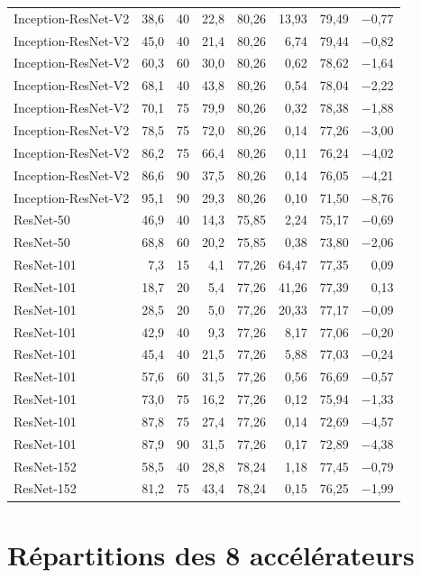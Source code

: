 {\begin{longtable}{@{}lrrrrrrr@{}}
Inception-ResNet-V2 & 38,6 & 40 & 22,8 & 80,26 & 13,93 & 79,49 & $-$0,77 \\
Inception-ResNet-V2 & 45,0 & 40 & 21,4 & 80,26 & 6,74 & 79,44 & $-$0,82 \\
Inception-ResNet-V2 & 60,3 & 60 & 30,0 & 80,26 & 0,62 & 78,62 & $-$1,64 \\
Inception-ResNet-V2 & 68,1 & 40 & 43,8 & 80,26 & 0,54 & 78,04 & $-$2,22 \\
Inception-ResNet-V2 & 70,1 & 75 & 79,9 & 80,26 & 0,32 & 78,38 & $-$1,88 \\
Inception-ResNet-V2 & 78,5 & 75 & 72,0 & 80,26 & 0,14 & 77,26 & $-$3,00 \\
Inception-ResNet-V2 & 86,2 & 75 & 66,4 & 80,26 & 0,11 & 76,24 & $-$4,02 \\
Inception-ResNet-V2 & 86,6 & 90 & 37,5 & 80,26 & 0,14 & 76,05 & $-$4,21 \\
Inception-ResNet-V2 & 95,1 & 90 & 29,3 & 80,26 & 0,10 & 71,50 & $-$8,76 \\
\addlinespace[2pt]
ResNet-50 & 46,9 & 40 & 14,3 & 75,85 & 2,24 & 75,17 & $-$0,69 \\
ResNet-50 & 68,8 & 60 & 20,2 & 75,85 & 0,38 & 73,80 & $-$2,06 \\
\addlinespace[2pt]
ResNet-101 & 7,3 & 15 & 4,1 & 77,26 & 64,47 & 77,35 & 0,09 \\
ResNet-101 & 18,7 & 20 & 5,4 & 77,26 & 41,26 & 77,39 & 0,13 \\
ResNet-101 & 28,5 & 20 & 5,0 & 77,26 & 20,33 & 77,17 & $-$0,09 \\
ResNet-101 & 42,9 & 40 & 9,3 & 77,26 & 8,17 & 77,06 & $-$0,20 \\
ResNet-101 & 45,4 & 40 & 21,5 & 77,26 & 5,88 & 77,03 & $-$0,24 \\
ResNet-101 & 57,6 & 60 & 31,5 & 77,26 & 0,56 & 76,69 & $-$0,57 \\
ResNet-101 & 73,0 & 75 & 16,2 & 77,26 & 0,12 & 75,94 & $-$1,33 \\
ResNet-101 & 87,8 & 75 & 27,4 & 77,26 & 0,14 & 72,69 & $-$4,57 \\
ResNet-101 & 87,9 & 90 & 31,5 & 77,26 & 0,17 & 72,89 & $-$4,38 \\
\addlinespace[2pt]
ResNet-152 & 58,5 & 40 & 28,8 & 78,24 & 1,18 & 77,45 & $-$0,79 \\
ResNet-152 & 81,2 & 75 & 43,4 & 78,24 & 0,15 & 76,25 & $-$1,99 \\
\end{longtable}
}

\section{Répartitions des 8 accélérateurs}

